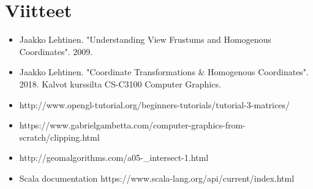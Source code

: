 \documentclass[12pt] {article}
\begin{document}
\section {Viitteet}

\begin{itemize}
	\item Jaakko Lehtinen. "Understanding View Frustums and Homogenous Coordinates". 2009.
	\item Jaakko Lehtinen. "Coordinate Transformations \& Homogenous Coordinates". 2018. Kalvot kurssilta CS-C3100 Computer Graphics.
	\item http://www.opengl-tutorial.org/beginners-tutorials/tutorial-3-matrices/
	\item https://www.gabrielgambetta.com/computer-graphics-from-scratch/clipping.html
	\item http://geomalgorithms.com/a05-\_intersect-1.html
	\item Scala documentation https://www.scala-lang.org/api/current/index.html
\end{itemize}
\end{document}
